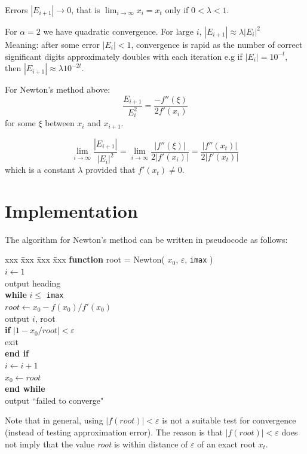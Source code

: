 \documentclass [titlepage,12pt,letter] {article}
\begin{document}
Errors $|E_{i+1}| \rightarrow 0$, that is $\lim_{i \rightarrow \infty}
x_i = x_t$ only if $0 < \lambda < 1$.

For $\alpha = 2$ we have quadratic convergence. For large $i$, $|E_{i+1}| \approx \lambda |E_i|^2$ 
\\
Meaning: after some error $|E_i| < 1$, convergence is rapid as the number of correct significant digits approximately doubles with each iteration e.g if 
$|E_i| = 10^{-t}$, then $|E_{i+1}| \approx \lambda 10^{-2t}$. 

For Newton's method above: 
\[ 
\frac{E_{i+1}}{E_{i}^2} = \frac{-f''(\xi)}{2f'(x_i)} 
\] 
\noindent for some $\xi$ between $x_i$ and $x_{i+1}$. 

\[
\lim_{i \rightarrow \infty} \frac{|E_{i+1}|}{|E_i|^2} = \lim_{i \rightarrow \infty} 
\frac{|f''(\xi)|}{2|f'(x_i)|} = \frac{|f''(x_t)|}{2|f'(x_t)|}
\]
\noindent 
which is a constant $\lambda$ provided that $f'(x_t) \neq 0$. 
\\

\section{Implementation}

The algorithm for Newton's method can be written in pseudocode as
follows: 

\begin{tabbing}
  xxx \= xxx \= xxx \= xxx \kill
\> \textbf{function} root = Newton( $x_0$, $\varepsilon$, \texttt{imax} ) \\
\> $i \leftarrow 1$ \\
\> output heading \\
\> \textbf{while} $i \le $ \texttt{imax} \\
\> \> $root \leftarrow x_0 - f(x_0)/f'(x_0)$ \\
\> \> output $i$, root \\
\> \> \textbf{if} $|1-x_0/root| < \varepsilon$ \\
\> \> \> exit \\
\> \> \textbf{end if} \\
\> \> $i \leftarrow i + 1$ \\
\> \> $x_0 \leftarrow root$ \\
\> \textbf{end while} \\
\> output ``failed to converge"
\end{tabbing}

\noindent 
Note that in general, using $|f(root)| < \varepsilon$ is not a suitable
test for convergence (instead of testing approximation error). The
reason is that $|f(root)| < \varepsilon$ does not imply that the value
{\it root} is within distance of $\varepsilon$ of an exact root $x_t$. 
\end{document}
